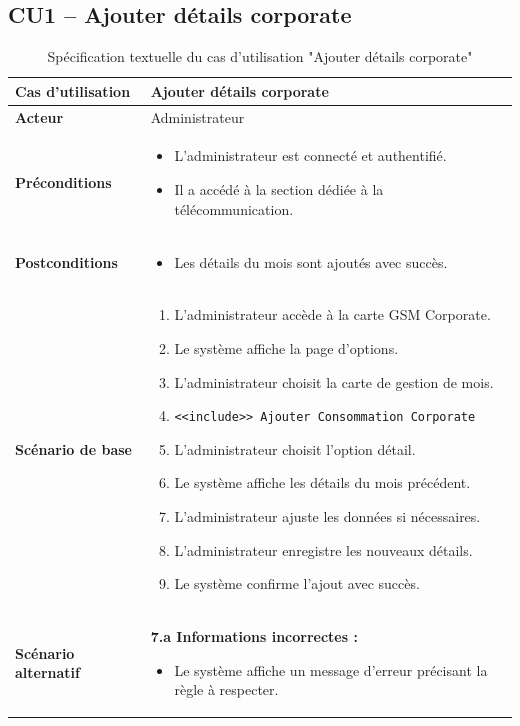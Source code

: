 \documentclass[a4paper,11pt]{report}
\begin{document}
\subsection*{CU1 – Ajouter détails corporate}
\begin{table}[H]
  \centering
  \renewcommand{\arraystretch}{1.5}
  \caption{Spécification textuelle du cas d'utilisation "Ajouter détails corporate"}
  \begin{tabularx}{\textwidth}{|l|X|}
    \hline
    \textbf{Cas d'utilisation} & Ajouter détails corporate \\ \hline
    \textbf{Acteur}            & Administrateur \\ \hline
    \textbf{Préconditions}     & 
      \begin{itemize}
        \item L’administrateur est connecté et authentifié.
        \item Il a accédé à la section dédiée à la télécommunication.
      \end{itemize} \\ \hline
    \textbf{Postconditions}    & 
      \begin{itemize}
        \item Les détails du mois sont ajoutés avec succès.
      \end{itemize} \\ \hline
    \textbf{Scénario de base}  & 
      \begin{enumerate}
        \item L’administrateur accède à la carte GSM Corporate.
        \item Le système affiche la page d’options.
        \item L’administrateur choisit la carte de gestion de mois.
        \item \texttt{<<include>> Ajouter Consommation Corporate}
        \item L’administrateur choisit l’option détail.
        \item Le système affiche les détails du mois précédent.
        \item L’administrateur ajuste les données si nécessaires.
        \item L’administrateur enregistre les nouveaux détails.
        \item Le système confirme l’ajout avec succès.
      \end{enumerate} \\ \hline
    \textbf{Scénario alternatif} & 
      \textbf{7.a Informations incorrectes :}
      \begin{itemize}
        \item Le système affiche un message d’erreur précisant la règle à respecter.
      \end{itemize} \\ \hline
  \end{tabularx}
\end{table}
\end{document}

